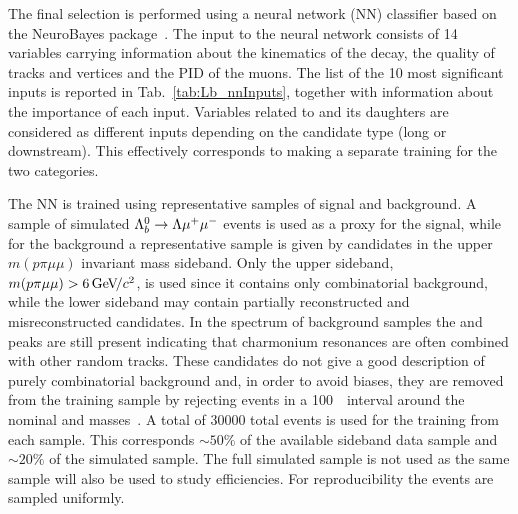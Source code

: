 The final selection is performed using a neural network (NN) classifier based on the NeuroBayes 
package~\cite{Feindt:2006pm,feindt-2004}. The input to the neural network consists of 14 variables carrying 
information about the kinematics of the decay, the quality of tracks and vertices and the PID of the muons.
The list of the 10 most significant inputs is reported in Tab.~\ref{tab:Lb_nnInputs}, together with information 
about the importance of each input.
%
%
%
Variables related to \Lz and its daughters are considered as different inputs depending on the
candidate type (long or downstream). This effectively corresponds to making a separate
training for the two categories. 

The NN is trained using representative samples of signal and background.  A sample of simulated 
${{\Lambda}^0_{b}}\rightarrow{\ensuremath{\Lambda}}{\ensuremath{\mu^+\mu^-}}$ events is used as a proxy for the signal, while for the background a representative sample
is given by candidates in the upper $m(p\pi\mu\mu)$ invariant mass sideband. Only the upper sideband,
$m(p\pi\mu\mu) > 6 \gevcc$, is used since it contains only combinatorial background,
while the lower sideband may contain partially reconstructed and misreconstructed candidates.
In the \qsq spectrum of background samples the \jpsi and \psitwos peaks are still present indicating that charmonium
resonances are often combined with other random tracks. These candidates do not give a good description of purely
combinatorial background and, in order to avoid biases, they are removed from the training
sample by rejecting events in a 100~\mevcc~interval around the nominal \jpsi and \psitwos masses~\cite{PDG2014}.
A total of 30000 total events is used for the training from each sample. This corresponds $\sim 50\%$ of the available
sideband data sample and $\sim 20\%$ of the simulated sample. The full simulated sample is not used
as the same sample will also be used to study efficiencies. For reproducibility the events are sampled uniformly.

